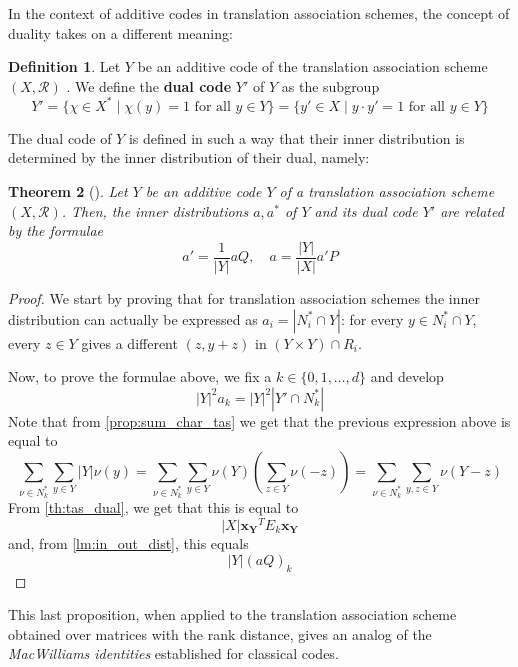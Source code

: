 \documentclass[a4paper,12pt]{article}
\theoremstyle{plain}
\newtheorem{theorem}{Theorem}
\theoremstyle{definition}
\newtheorem{definition}[theorem]{Definition}
\theoremstyle{remark}
\begin{document}
In the context of additive codes in translation association schemes, the concept
of duality takes on a different meaning:
\begin{definition}
    Let $ Y $ be an additive code of the translation association scheme
    $ (X,\mathcal{R}) $ . We define the \textbf{dual code} $ Y' $ of $ Y $ as the
    subgroup
    \[ Y' = \{ \chi \in X^* \mid \chi(y) = 1 \text{ for all } y \in Y \} =
    \{ y' \in X \mid  y \cdot y' = 1 \text{ for all } y \in Y \}\]
\end{definition}

The dual code of $ Y $ is defined in such a way
that their inner distribution is determined by the inner distribution of their
dual, namely:
\begin{theorem}[{\parencite[Theorem 2.10.12]{brouwer_distance-regular_1989}}]
    Let $ Y $ be an additive code $ Y $ of a translation association
    scheme $ (X, \mathcal{R}) $. Then, the inner distributions $ a,a^* $ of
    $ Y $ and its dual code $ Y' $ are related by the formulae
    \begin{equation*}
        a' = \frac{1}{|Y|}aQ, \quad a = \frac{|Y|}{|X|}a'P
    \end{equation*}
    \label{th:add_tas_inner_dist}
\end{theorem}
\begin{proof}
    We start by proving that for translation association schemes the inner
    distribution can actually be expressed as $ a_i = |N_i^* \cap Y| $:
    for every $ y \in N_i^* \cap Y $, every $ z \in Y $ gives a different
    $ (z,y+z) $ in $ (Y \times Y) \cap R_i $.

    Now, to prove the formulae above, we fix a $ k \in \{ 0,1,\dots,d \} $ and
    develop
    \[ |Y|^2a_k = |Y|^2 |Y'\cap N_k^*| \]
    Note that
    from \ref{prop:sum_char_tas} we get that the previous expression above is
    equal to
    \[
        \sum_{ \nu \in N_k^* }\sum_{ y\in Y } |Y|\nu(y) =
        \sum_{ \nu \in N_k^* } \sum_{ y \in Y } \nu(Y) (\sum_{ z \in Y } \nu(-z)) =
        \sum_{ \nu \in N_k^* } \sum_{ y,z \in Y } \nu(Y-z)
    \]
    From \ref{th:tas_dual}, we get that this is equal to
    \[ |X| \boldsymbol{x_Y}^TE_k\boldsymbol{x_Y} \]
    and, from \ref{lm:in_out_dist}, this equals
    \[ |Y|(aQ)_k \]

\end{proof}
This last proposition, when applied to the translation association scheme obtained
over matrices with the rank distance, gives an analog of the
\textit{MacWilliams identities} established for classical codes.

\newpage
\printbibliography
\end{document}
